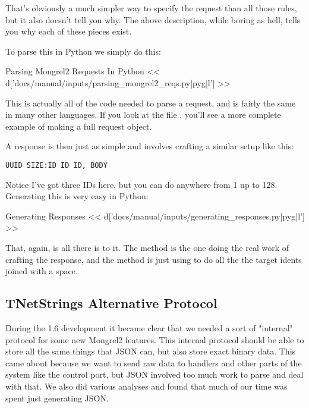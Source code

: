 That's obviously a much simpler way to specify the request than all those
rules, but it also doesn't tell you why.  The above description, while
boring as hell, tells you why each of these pieces exist.

To parse this in Python we simply do this:

\begin{code}{Parsing Mongrel2 Requests In Python}
<< d['docs/manual/inputs/parsing_mongrel2_reqs.py|pyg|l'] >>
\end{code}

This is actually all of the code needed to parse a request, and is
fairly the same in many other languages.  If you look at the file
, you'll see a more complete
example of making a full request object.

A response is then just as simple and involves crafting a similar
setup like this:

\begin{Verbatim}
UUID SIZE:ID ID ID, BODY
\end{Verbatim}

Notice I've got three IDs here, but you can do anywhere from 1 up to 128.  Generating
this is very easy in Python:

\begin{code}{Generating Responses}
<< d['docs/manual/inputs/generating_responses.py|pyg|l'] >>
\end{code}

That, again, is all there is to it.  The  method is the
one doing the real work of crafting the response, and the 
method is just using  to do all the the target idents
joined with a space.

\subsection{TNetStrings Alternative Protocol}

During the 1.6 development it became clear that we needed a sort of "internal"
protocol for some new Mongrel2 features.  This internal protocol should be
able to store all the same things that JSON can, but also store exact binary
data.  This came about because we want to send raw data to handlers and 
other parts of the system like the control port, but JSON involved too
much work to parse and deal with that.  We also did various analyses and 
found that much of our time was spent just generating JSON.

